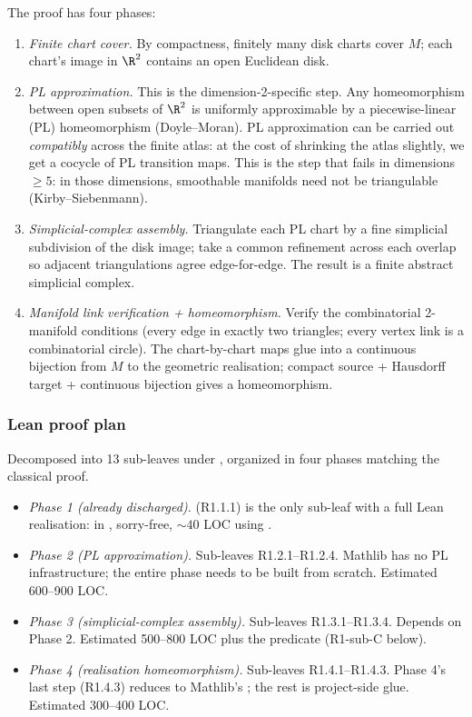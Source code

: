 The proof has four phases:

\begin{enumerate}
\item \emph{Finite chart cover.}  By compactness, finitely many disk
  charts cover \(M\); each chart's image in \(\R^2\) contains an open
  Euclidean disk.
\item \emph{PL approximation.}  This is the dimension-2-specific
  step.  Any homeomorphism between open subsets of \(\R^2\) is
  uniformly approximable by a piecewise-linear (PL) homeomorphism
  (Doyle--Moran).  PL approximation can be carried out
  \emph{compatibly} across the finite atlas: at the cost of shrinking
  the atlas slightly, we get a cocycle of PL transition maps.  This
  is the step that fails in dimensions \(\geq 5\): in those
  dimensions, smoothable manifolds need not be triangulable
  (Kirby--Siebenmann).
\item \emph{Simplicial-complex assembly.}  Triangulate each PL chart
  by a fine simplicial subdivision of the disk image; take a common
  refinement across each overlap so adjacent triangulations agree
  edge-for-edge.  The result is a finite abstract simplicial
  complex.
\item \emph{Manifold link verification + homeomorphism.}  Verify the
  combinatorial 2-manifold conditions (every edge in exactly two
  triangles; every vertex link is a combinatorial circle).  The
  chart-by-chart maps glue into a continuous bijection from \(M\) to
  the geometric realisation; compact source + Hausdorff target +
  continuous bijection gives a homeomorphism.
\end{enumerate}

\subsubsection*{Lean proof plan}

Decomposed into 13 sub-leaves under
, organized in four phases
matching the classical proof.

\begin{itemize}
\item \emph{Phase 1 (already discharged).}
   (R1.1.1) is the only sub-leaf with a
  full Lean realisation: 
  in , sorry-free, ${\sim}40$ LOC using
  .
\item \emph{Phase 2 (PL approximation).}  Sub-leaves R1.2.1--R1.2.4.
  Mathlib has no PL infrastructure; the entire phase needs to be
  built from scratch.  Estimated 600--900 LOC.
\item \emph{Phase 3 (simplicial-complex assembly).}  Sub-leaves
  R1.3.1--R1.3.4.  Depends on Phase 2.  Estimated 500--800 LOC plus
  the  predicate (R1-sub-C below).
\item \emph{Phase 4 (realisation homeomorphism).}  Sub-leaves
  R1.4.1--R1.4.3.  Phase 4's last step (R1.4.3) reduces to Mathlib's
  ; the rest is project-side
  glue.  Estimated 300--400 LOC.
\end{itemize}

